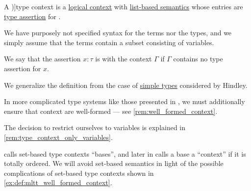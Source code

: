 \begin{definition}\label{def:type_context}
  A \term[en=type-context (\cite[def. 2A5]{Hindley1997BasicSTT})]{type context} is a \hyperref[def:logical_context]{logical context} with \hyperref[def:logical_context_semantics]{list-based semantics} whose entries are \hyperref[def:type_assertion]{type assertion} for .

  We have purposely not specified syntax for the terms nor the types, and we simply assume that the terms contain a subset consisting of variables.

  We say that the assertion \( x: \tau \) is  with the context \( \Gamma \) if \( \Gamma \) contains no type assertion for \( x \).
\end{definition}
\begin{comments}
  \item We generalize the definition from the case of \hyperref[def:simple_type]{simple types} considered by Hindley.

  \item In more complicated type systems like those presented in , we must additionally ensure that context are well-formed --- see \cref{rem:well_formed_context}.

  \item The decision to restrict ourselves to variables is explained in \cref{rem:type_context_only_variables}.

  \item {} calls set-based type contexts \enquote{bases}, and later in \cite[def. 5.1.5]{Barendregt1992LambdaCalculiWithTypes} calls a base a \enquote{context} if it is totally ordered. We will avoid set-based semantics in light of the possible complications of set-based type contexts shown in \cref{ex:def:mltt_well_formed_context}.
\end{comments}

